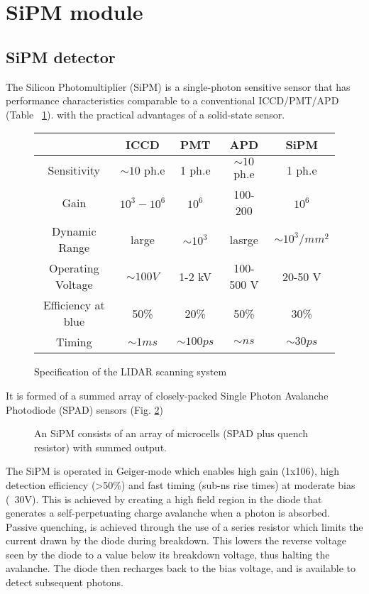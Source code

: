\section{SiPM module}
\subsection{SiPM detector}
The Silicon Photomultiplier (SiPM) is a single-photon sensitive sensor that has
performance characteristics comparable to a conventional ICCD/PMT/APD (Table ~\ref{tbl:sipm_comparison}).
with the practical advantages of a solid-state sensor. 


\begin{figure}[H]
\begin{center}
\begin{tabular}{ |c|c|c|c|c| } 
\hline
& ICCD & PMT & APD & SiPM  \\
\hline
Sensitivity & $\sim 10$ ph.e & 1 ph.e & $\sim 10$ ph.e & 1 ph.e  \\ 
\hline
Gain & $10^3-10^6$ & $10^6$ & 100-200 & $10^6$ \\ 
\hline
Dynamic Range & large & $\sim 10^3$  & lasrge & $\sim 10^3/mm^2$\\ 
\hline
Operating Voltage & $\sim 100 V$ & 1-2 kV & 100-500 V & 20-50 V\\ 
\hline
Efficiency at blue & 50\% & 20\% & 50\% & 30\% \\ 
\hline
Timing & $\sim 1 ms$ & $\sim 100 ps$ & $\sim ns$ & $\sim 30 ps$\\ 
\hline
\end{tabular}
\vspace{-5mm}
\caption{Specification of the LIDAR scanning system}
\label{tbl:sipm_comparison}
\end{center}
\end{figure}


It is formed of a summed array of closely-packed Single Photon Avalanche Photodiode (SPAD) sensors (Fig. \ref{fig:sipm_structure})

\begin{figure}[H]
\caption{An SiPM consists of an array of microcells
(SPAD plus quench resistor) with summed output.}
\label{fig:sipm_structure}
\end{figure}


The SiPM is operated in Geiger-mode which enables high gain
(1x106), high detection efficiency (>50\%) and fast timing
(sub-ns rise times) at moderate bias (~30V). This is achieved by creating a high
field region in the diode that generates a self-perpetuating charge
avalanche when a photon is absorbed. Passive
quenching, is achieved through the use of a
series resistor which limits the current drawn by the diode during
breakdown. This lowers the reverse voltage seen by the diode to a
value below its breakdown voltage, thus halting the avalanche. The
diode then recharges back to the bias voltage, and is available to
detect subsequent photons.


